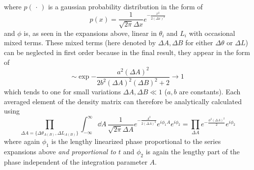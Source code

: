 where $p(\,\cdot\,)$ is a gaussian probability distribution in the form of
\begin{equation}
  p(x) = \frac{1}{\sqrt{2\pi}\Delta x} e^{-\frac{x^2}{2(\Delta x)^2}}
\end{equation}
and $\phi$ is, as seen in the expansions above, linear in $\theta_i$ and $L_i$ with occasional mixed terms.
These mixed terms (here denoted by $\Delta A,\Delta B$ for either $\Delta\theta$ or $\Delta L$) can be neglected in first order because in the final result, they appear in the form of
\begin{equation}
  \sim \exp{-\frac{a^2(\Delta A)^2}{2b^2(\Delta A)^2(\Delta B)^2 + 2}} \rightarrow 1
\end{equation}
which tends to one for small variations $\Delta A,\Delta B \ll 1$ ($a,b$ are constants).
Each averaged element of the density matrix can therefore be analytically calculated using 
\begin{equation} \label{eq:apx:average-density-element-calculation}
  \prod_{\Delta A = \{\Delta \theta_{A(B)}, \Delta L_{A(B)}\}} \int_{-\infty}^{\infty} \dd A \, \frac{1}{\sqrt{2\pi}\Delta A} e^{-\frac{A^2}{2 (\Delta A)^2}} e^{i\phi_1 A} e^{i\phi_2} = \prod_{\Delta A} e^{-\frac{\phi^2 (\Delta A)^2}{2}} e^{i\phi_2}
\end{equation}
where again $\phi_1$ is the lengthy linearized phase proportional to the series expansions above \textit{and proportional to $t$} and $\phi_2$ is again the lengthy part of the phase independent of the integration parameter $A$.

